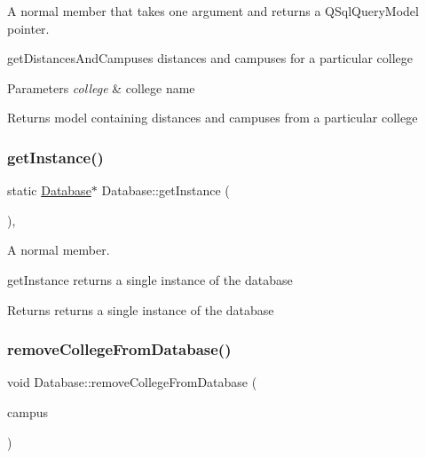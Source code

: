 A normal member that takes one argument and returns a Q\+Sql\+Query\+Model pointer. 

get\+Distances\+And\+Campuses distances and campuses for a particular college 
\begin{DoxyParams}{Parameters}
{\em college} & college name \\
\hline
\end{DoxyParams}
\begin{DoxyReturn}{Returns}
model containing distances and campuses from a particular college 
\end{DoxyReturn}
\mbox{\label{class_database_a71e30b03e228b01f1460c73e770e3e49}} 
\subsubsection{\texorpdfstring{get\+Instance()}{getInstance()}}
{\footnotesize\ttfamily static \hyperlink{class_database}{Database}$\ast$ Database\+::get\+Instance (\begin{DoxyParamCaption}{ }\end{DoxyParamCaption})\hspace{0.3cm}{\ttfamily [inline]}, {\ttfamily [static]}}



A normal member. 

get\+Instance returns a single instance of the database \begin{DoxyReturn}{Returns}
returns a single instance of the database 
\end{DoxyReturn}
\mbox{\label{class_database_ac1affb187b17ae9368aaa9a0cbd98fd3}} 
\subsubsection{\texorpdfstring{remove\+College\+From\+Database()}{removeCollegeFromDatabase()}}
{\footnotesize\ttfamily void Database\+::remove\+College\+From\+Database (\begin{DoxyParamCaption}\item[{Q\+String}]{campus }\end{DoxyParamCaption})}



